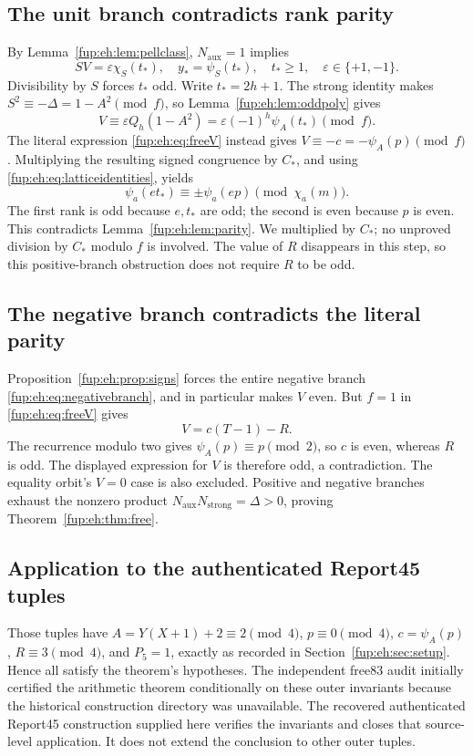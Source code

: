 \documentclass[11pt,letterpaper]{article}
\theoremstyle{definition}\newtheorem{definition}[theorem]{Definition}
\theoremstyle{remark}\newtheorem{remark}[theorem]{Remark}
\newcommand{\D}{\Delta}
\newcommand{\Na}{N_{\mathrm{aux}}}\newcommand{\Nk}{N_{\mathrm{index}}}\newcommand{\Nt}{N_{\mathrm{transport}}}
\newcommand{\Ns}{N_{\mathrm{strong}}}
\begin{document}
\subsection{The unit branch contradicts rank parity}
By Lemma~\ref{fup:eh:lem:pellclass}, $\Na=1$ implies
\[
 SV=\varepsilon\chi_S(t_*),\quad y_*=\psi_S(t_*),\quad
 t_*\ge1,\quad \varepsilon\in\{+1,-1\}.
\]
Divisibility by $S$ forces $t_*$ odd. Write $t_*=2h+1$.
The strong identity makes $S^2\equiv-\D=1-A^2\pmod f$,
so Lemma~\ref{fup:eh:lem:oddpoly} gives
\[
 V\equiv\varepsilon Q_h(1-A^2)
 =\varepsilon(-1)^h\psi_A(t_*)\pmod f.
\]
The literal expression \eqref{fup:eh:eq:freeV} instead gives
$V\equiv-c=-\psi_A(p)\pmod f$. Multiplying the resulting signed
congruence by $C_*$, and using \eqref{fup:eh:eq:latticeidentities}, yields
\[
 \psi_a(et_*)\equiv\pm\psi_a(ep)\pmod{\chi_a(m)}.
\]
The first rank is odd because $e,t_*$ are odd; the second is even
because $p$ is even. This contradicts Lemma~\ref{fup:eh:lem:parity}.
We multiplied by $C_*$; no unproved division by $C_*$ modulo $f$
is involved. The value of $R$ disappears in this step, so this
positive-branch obstruction does not require $R$ to be odd.

\subsection{The negative branch contradicts the literal parity}
Proposition~\ref{fup:eh:prop:signs} forces the entire negative branch
\eqref{fup:eh:eq:negativebranch}, and in particular makes $V$ even.
But $f=1$ in \eqref{fup:eh:eq:freeV} gives
\[
 V=c(T-1)-R.
\]
The recurrence modulo two gives $\psi_A(p)\equiv p\pmod2$,
so $c$ is even, whereas $R$ is odd. The displayed expression for
$V$ is therefore odd, a contradiction. The equality orbit's
$V=0$ case is also excluded. Positive and negative branches exhaust
the nonzero product $\Na\Ns=\D>0$, proving
Theorem~\ref{fup:eh:thm:free}.

\subsection{Application to the authenticated Report45 tuples}
Those tuples have $A=Y(X+1)+2\equiv2\pmod4$,
$p\equiv0\pmod4$, $c=\psi_A(p)$, $R\equiv3\pmod4$, and
$P_5=1$, exactly as recorded in Section~\ref{fup:eh:sec:setup}.
Hence all satisfy the theorem's hypotheses. The independent free83
audit initially certified the arithmetic theorem conditionally on these
outer invariants because the historical construction directory was
unavailable. The recovered authenticated Report45 construction supplied
here verifies the invariants and closes that source-level application.
It does not extend the conclusion to other outer tuples.
\end{document}
